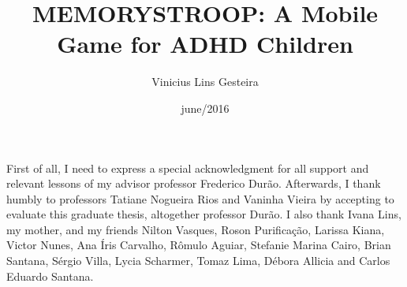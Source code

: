\documentclass[pr-br,twoside,onehalfspacing,bsc]{risethesis}
\title{MEMORYSTROOP: A Mobile Game for ADHD Children}
\date{june/2016}
\author{Vinicius Lins Gesteira}
\begin{document}
\frontmatter
\let\cleardoublepage\clearpage
\frontpage
\presentationpage



\acknowledgements

First of all, I need to express a special acknowledgment for all support and relevant lessons of my advisor professor Frederico Dur\~{a}o. Afterwards, I thank humbly to professors Tatiane Nogueira Rios and Vaninha Vieira by accepting to evaluate this graduate thesis, altogether professor Dur\~{a}o.
I also thank Ivana Lins, my mother, and my friends Nilton Vasques, Roson Purificação, Larissa Kiana, Victor Nunes, Ana  \'Iris Carvalho, R\^omulo Aguiar, Stefanie Marina Cairo, Brian Santana, S\'ergio Villa, Lycia Scharmer, Tomaz Lima, D\'ebora Allicia and Carlos Eduardo Santana.

\abstract

\let\cleardoublepage\clearpage
\tableofcontents

\listoffigures


\listofacronyms

\let\cleardoublepage\clearpage


\mainmatter












%
\end{document}
